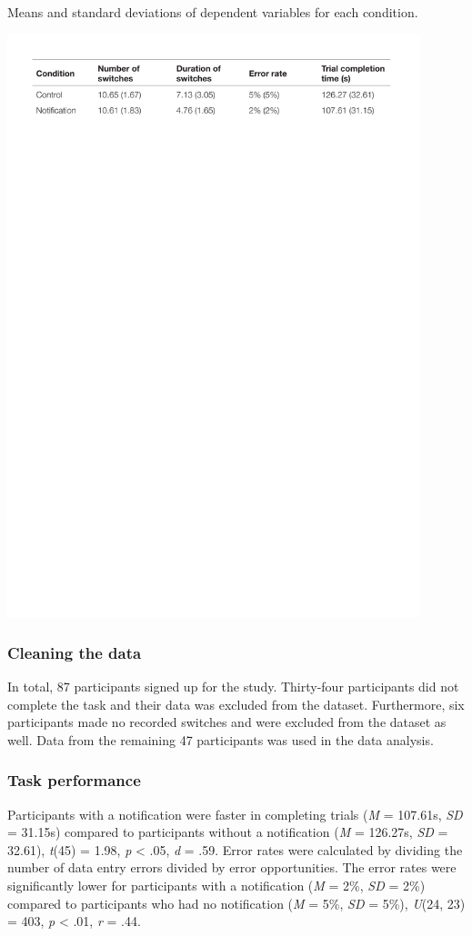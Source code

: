 \begin{table}
\caption[Study 6 means and SDs of dependent measures]{Means and standard deviations of dependent variables for each condition.}
\centering
\includegraphics[width=0.9\textwidth]{images/ch56/ch56-descstats.pdf}
\vspace{-3pt}
\label{tbl:ch56-Table1}
\end{table}

\subsubsection{Cleaning the data}
In total, 87 participants signed up for the study. Thirty-four participants did not complete the task and their data was excluded from the dataset.
Furthermore, six participants made no recorded switches and were excluded from the dataset as well. Data from the remaining 47 participants was used in the data analysis.

\subsubsection{Task performance}
Participants with a notification were faster in completing trials (\textit{M} = 107.61s, \textit{SD} = 31.15s) compared to participants without a notification (\textit{M} = 126.27s, \textit{SD} = 32.61), \textit{t}(45) = 1.98, \textit{p} < .05, \textit{d} = .59.
Error rates were calculated by dividing the number of data entry errors divided by error opportunities. The error rates were significantly lower for participants with a notification (\textit{M }= 2\%, \textit{SD} = 2\%) compared to participants who had no notification (\textit{M} = 5\%, \textit{SD }= 5\%), \textit{U}(24, 23) = 403, \textit{p} < .01, \textit{r} = .44. 

